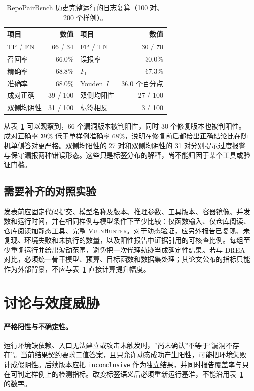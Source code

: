 \documentclass[UTF8,a4paper,11pt,fontset=fandol]{ctexart}
\newcommand{\VH}{\textsc{VulnHunter}}
\newcommand{\DREA}{\textsc{DREA}}
\begin{document}
\begin{table}[htbp]
\centering
\caption{RepoPairBench 历史完整运行的日志复算（100 对、200 个样例）。}
\label{tab:historical}
\begin{tabular}{lrlr}
\toprule
项目 & 数值 & 项目 & 数值\\
\midrule
TP / FN & 66 / 34 & FP / TN & 30 / 70\\
召回率 & 66.0\% & 误报率 & 30.0\%\\
精确率 & 68.8\% & $F_1$ & 67.3\%\\
准确率 & 68.0\% & Youden $J$ & 36.0 个百分点\\
成对正确 & 39 / 100 & 双侧均阳性 & 27 / 100\\
双侧均阴性 & 31 / 100 & 标签相反 & 3 / 100\\
\bottomrule
\end{tabular}
\end{table}

从表~\ref{tab:historical} 可以观察到，66 个漏洞版本被判阳性，同时 30 个修复版本也被判阳性。成对正确率 39\% 低于单样例准确率 68\%，说明在修复前后都给出正确结论比在随机单侧答对更严格。双侧均阳性的 27 对和双侧均阴性的 31 对分别提示过度报警与保守漏报两种错误形态。这些只是标签分布的解释，尚不能归因于某个工具或验证门槛。

\subsection{需要补齐的对照实验}
发表前应固定代码提交、模型名称及版本、推理参数、工具版本、容器镜像、并发数和运行时间，并在相同样例与模型条件下至少比较：仅函数输入、仅仓库阅读、仓库阅读加静态工具、完整 \VH{}。对于动态验证，应另外报告已复现、未复现、环境失败和未执行的数量，以及阳性报告中证据引用的可核查比例。每组至少重复运行并给出波动范围，避免把一次代理轨迹当成确定性结果。若与 \DREA{} 对比，必须统一骨干模型、预算、目标函数和数据集处理；其论文公布的指标只能作为外部背景，不应与表~\ref{tab:historical} 直接计算提升幅度。

\section{讨论与效度威胁}
\paragraph{严格阳性与不确定性。} 运行环境缺依赖、入口无法建立或攻击未触发时，“尚未确认”不等于“漏洞不存在”。当前结果契约要求二值答案，且只允许动态成功产生阳性，可能把环境失败计成假阴性。后续版本应把 \texttt{inconclusive} 作为独立结果，并同时报告覆盖率与只在可判定样例上的检测指标。改变标签语义后必须重新运行基准，不能沿用表~\ref{tab:historical} 的数字。
\end{document}
